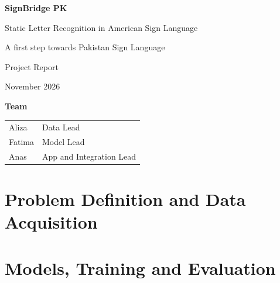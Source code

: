 \documentclass[11pt,a4paper]{article}
\begin{document}
\setlength{\emergencystretch}{6em}

\begin{titlepage}
  \centering
  \vspace*{3cm}
  {\Huge\bfseries SignBridge PK\par}
  \vspace{0.8cm}
  {\Large Static Letter Recognition in American Sign Language\par}
  \vspace{0.3cm}
  {\large A first step towards Pakistan Sign Language\par}
  \vspace{1.5cm}
  {\large Project Report\par}
  \vspace{0.3cm}
  {\large November 2026\par}
  \vspace{2.2cm}
  {\large\bfseries Team\par}
  \vspace{0.4cm}
  \begin{tabular}{ll}
    Aliza  & Data Lead \\
    Fatima & Model Lead \\
    Anas   & App and Integration Lead \\
  \end{tabular}
  \vfill
\end{titlepage}


\tableofcontents
\clearpage
{}




\part{Problem Definition and Data Acquisition}










\part{Models, Training and Evaluation}



















\begingroup
\raggedright

\endgroup
\end{document}
